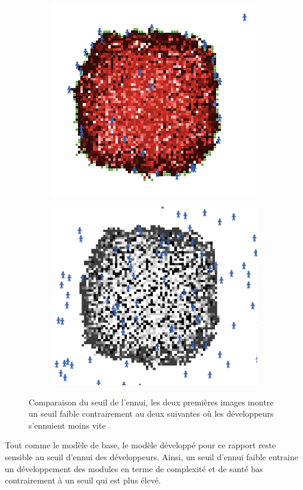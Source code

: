 \documentclass{article}
\begin{document}
\begin{figure}[H]
\begin{subfigure}{.5\textwidth}
    \includegraphics[width=.8\linewidth]{pictures/sensibilite_fort_ennui_complexite.png}
  \end{subfigure}
  \begin{subfigure}{.5\textwidth}
    \centering
    \includegraphics[width=.8\linewidth]{pictures/sensibilite_fort_ennui_sante.png}
  \end{subfigure}

  \caption{Comparaison du seuil de l'ennui, les deux premières images montre un seuil faible contrairement au deux suivantes où les développeurs s'ennuient moins vite}
\end{figure}
Tout comme le modèle de base, le modèle développé pour ce rapport reste sensible au seuil d'ennui des développeurs. Ainsi, un seuil d'ennui faible
entraine un développement des modules en terme de complexité et de santé bas contrairement à un seuil qui est plus élevé.
\end{document}
